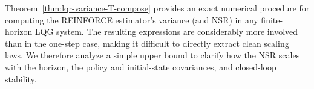 Theorem~\ref{thm:lqr-variance-T-compose} provides an exact numerical procedure for computing the REINFORCE estimator's variance (and NSR) in any finite-horizon LQG system. The resulting expressions are considerably more involved than in the one-step case, making it difficult to directly extract clean scaling laws. We therefore analyze a simple upper bound to clarify how the NSR scales with the horizon, the policy and initial-state covariances, and closed-loop stability.






